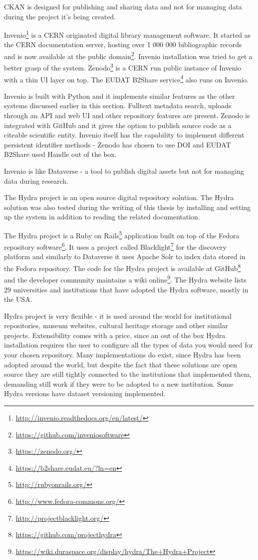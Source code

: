 CKAN is designed for publishing and sharing data and not for managing data
during the project it's being created.

Invenio\footnote{\url{http://invenio.readthedocs.org/en/latest/}} is a CERN
originated digital library management software. It started as the CERN
documentation server, hosting over 1 000 000 bibliographic records and is now
available at the public domain\footnote{\url{https://github.com/inveniosoftware}}.
Invenio installation was tried to get a better grasp of the system. Zenodo\footnote{\url{https://zenodo.org/}}
is a CERN run public instance of Invenio with a thin UI layer on top. The EUDAT
B2Share service\footnote{\url{https://b2share.eudat.eu/?ln=en}} also runs on
Invenio.

Invenio is built with Python and it implements similar features as the other
systems discussed earlier in this section. Fulltext metadata search, uploads
through an API and web UI and other repository features are present. Zenodo is
integrated with GitHub and it gives the option to publish source code as a
citeable scientific entity. Invenio itself has the capability to implement
different persistent identifier methods - Zenodo has chosen to use DOI and
EUDAT B2Share used Handle out of the box.

Invenio is like Dataverse - a tool to publish digital assets but not
for managing data during research.

The Hydra project is an open source digital repository solution. The Hydra
solution was also tested during the writing of this thesis by installing and
setting up the system in addition to reading the related documentation.

The Hydra project is a Ruby on Rails\footnote{\url{http://rubyonrails.org/}}
application built on top of the Fedora repository software\footnote{\url{http://www.fedora-commons.org/}}.
It uses a project called Blacklight\footnote{\url{http://projectblacklight.org/}}
for the discovery platform and similarly to Dataverse it uses Apache Solr to
index data stored in the Fedora repository. The code for the Hydra project is
available at GitHub\footnote{\url{https://github.com/projecthydra}} and the
developer community maintains a wiki online\footnote{\url{https://wiki.duraspace.org/display/hydra/The+Hydra+Project}}. The Hydra website lists 29 universities and institutions that have
adopted the Hydra software, mostly in the USA.

Hydra project is very flexible - it is used around the world for institutional
repositories, museum websites, cultural heritage storage and other similar
projects. Extensibility comes with a price, since an out of the box Hydra
installation requires the user to configure all the types of data you would
need for your chosen repository. Many implementations do exist, since Hydra
has been adopted around the world, but despite the fact that these solutions
are open source they are still tightly connected to the institutions that
implemented them, demanding still work if they were to be adopted to a new
institution. Some Hydra versions have dataset versioning implemented.


